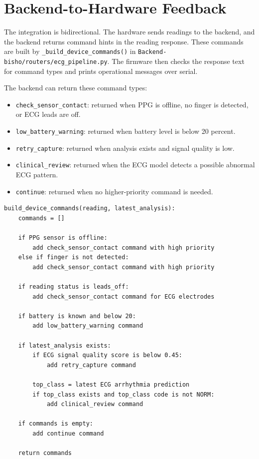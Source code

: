 \section{Backend-to-Hardware Feedback}

The integration is bidirectional. The hardware sends readings to the backend, and the backend returns command hints in the reading response. These commands are built by \texttt{\_build\_device\_commands()} in \texttt{Backend-bisho/routers/ecg\_pipeline.py}. The firmware then checks the response text for command types and prints operational messages over serial.

The backend can return these command types:

\begin{itemize}
    \item \texttt{check\_sensor\_contact}: returned when PPG is offline, no finger is detected, or ECG leads are off.
    \item \texttt{low\_battery\_warning}: returned when battery level is below 20 percent.
    \item \texttt{retry\_capture}: returned when analysis exists and signal quality is low.
    \item \texttt{clinical\_review}: returned when the ECG model detects a possible abnormal ECG pattern.
    \item \texttt{continue}: returned when no higher-priority command is needed.
\end{itemize}

\begin{lstlisting}[caption={Pseudocode for backend command generation}]
build_device_commands(reading, latest_analysis):
    commands = []

    if PPG sensor is offline:
        add check_sensor_contact command with high priority
    else if finger is not detected:
        add check_sensor_contact command with high priority

    if reading status is leads_off:
        add check_sensor_contact command for ECG electrodes

    if battery is known and below 20:
        add low_battery_warning command

    if latest_analysis exists:
        if ECG signal quality score is below 0.45:
            add retry_capture command

        top_class = latest ECG arrhythmia prediction
        if top_class exists and top_class code is not NORM:
            add clinical_review command

    if commands is empty:
        add continue command

    return commands
\end{lstlisting}

